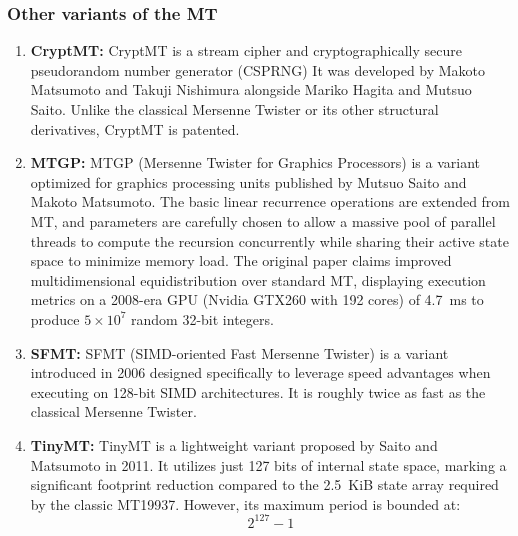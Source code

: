 \subsubsection{Other variants of the MT}
\begin{enumerate}
    \item \textbf{CryptMT:} CryptMT is a stream cipher and cryptographically secure pseudorandom number generator (CSPRNG)  It was developed by Makoto Matsumoto and Takuji Nishimura alongside Mariko Hagita and Mutsuo Saito. Unlike the classical Mersenne Twister or its other structural derivatives, CryptMT is patented.
    
    \item \textbf{MTGP:} MTGP (Mersenne Twister for Graphics Processors) is a variant optimized for graphics processing units published by Mutsuo Saito and Makoto Matsumoto. The basic linear recurrence operations are extended from MT, and parameters are carefully chosen to allow a massive pool of parallel threads to compute the recursion concurrently while sharing their active state space to minimize memory load. The original paper claims improved multidimensional equidistribution over standard MT, displaying execution metrics on a 2008-era GPU (Nvidia GTX260 with 192 cores) of 4.7~ms to produce $5 \times 10^7$ random 32-bit integers.

    \item \textbf{SFMT:} SFMT (SIMD-oriented Fast Mersenne Twister) is a variant introduced in 2006 designed specifically to leverage speed advantages when executing on 128-bit SIMD architectures. It is roughly twice as fast as the classical Mersenne Twister. 

    \item \textbf{TinyMT:} TinyMT is a lightweight variant proposed by Saito and Matsumoto in 2011. It utilizes just 127 bits of internal state space, marking a significant footprint reduction compared to the 2.5~KiB state array required by the classic MT19937. However, its maximum period is bounded at:
    \[
    2^{127} - 1
    \]
    
\end{enumerate}

